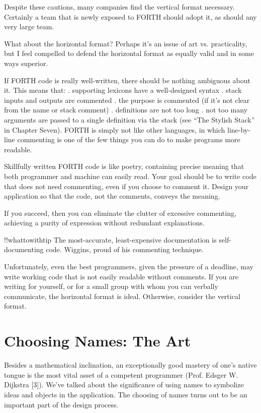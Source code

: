 Despite these cautions, many companies find the vertical format
necessary.  Certainly a team that is newly exposed to FORTH should
adopt it, as should any very large team.

What about the horizontal format? Perhaps it's an issue of art vs.
practicality, but I feel compelled to defend the horizontal format as equally
valid and in some ways superior.

If FORTH code is really well-written, there should be nothing ambiguous
about it.  This means that:
. supporting lexicons have a well-designed syntax
. stack inputs and outputs are commented
. the purpose is commented (if it's not clear from the name or stack comment)
. definitions are not too long
. not too many arguments are passed to a single definition via the stack (see
``The Stylish Stack'' in Chapter Seven).
FORTH is simply not like other languages, in which line-by-line
commenting is one of the few things you can do to make programs more
readable.

Skillfully written FORTH code is like poetry, containing precise
meaning that both programmer and machine can easily read.  Your goal
should be to write code that does not need commenting, even if you
choose to comment it.  Design your application so that the code, not the
comments, conveys the meaning.

If you succeed, then you can eliminate the clutter of excessive
commenting, achieving a purity of expression without redundant
explanations.

!!whattowithtip{
The most-accurate, least-expensive documentation is self-documenting
code.
}
Wiggins, proud of his commenting technique.

Unfortunately, even the best programmers, given the pressure of a
deadline, may write working code that is not easily readable without comments.
If you are writing for yourself, or for a small group with whom
you can verbally communicate, the horizontal format is ideal.  Otherwise,
consider the vertical format.

\section{Choosing Names: The Art}

Besides a mathematical inclination, an exceptionally good mastery of one's
native tongue is the most vital asset of a competent programmer (Prof.
Edsger W. Dijkstra [3]).
We've talked about the significance of using names to symbolize ideas
and objects in the application.  The choosing of names turns out to be an
important part of the design process.

